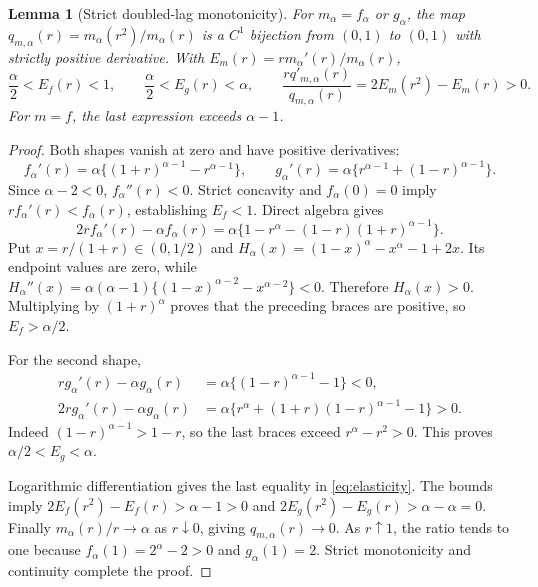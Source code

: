 \documentclass[11pt,a4paper]{article}
\newtheorem{lemma}[theorem]{Lemma}
\theoremstyle{remark}\newtheorem{remark}[theorem]{Remark}
\begin{document}
\begin{lemma}[Strict doubled-lag monotonicity]\label{lem:ratio}
For $m_\alpha=f_\alpha$ or $g_\alpha$, the map
$q_{m,\alpha}(r)=m_\alpha(r^2)/m_\alpha(r)$ is a $C^1$ bijection from $(0,1)$ to $(0,1)$ with strictly positive derivative. With $E_m(r)=rm_\alpha'(r)/m_\alpha(r)$,
\begin{equation}\label{eq:elasticity}
\frac\alpha2<E_f(r)<1,\qquad
\frac\alpha2<E_g(r)<\alpha,\qquad
\frac{rq'_{m,\alpha}(r)}{q_{m,\alpha}(r)}=2E_m(r^2)-E_m(r)>0.
\end{equation}
For $m=f$, the last expression exceeds $\alpha-1$.
\end{lemma}
\begin{proof}
Both shapes vanish at zero and have positive derivatives:
\[
f_\alpha'(r)=\alpha\{(1+r)^{\alpha-1}-r^{\alpha-1}\},\qquad
g_\alpha'(r)=\alpha\{r^{\alpha-1}+(1-r)^{\alpha-1}\}.
\]
Since $\alpha-2<0$, $f_\alpha''(r)<0$. Strict concavity and $f_\alpha(0)=0$ imply $rf_\alpha'(r)<f_\alpha(r)$, establishing $E_f<1$. Direct algebra gives
\[
2rf_\alpha'(r)-\alpha f_\alpha(r)
=\alpha\{1-r^\alpha-(1-r)(1+r)^{\alpha-1}\}.
\]
Put $x=r/(1+r)\in(0,1/2)$ and
$H_\alpha(x)=(1-x)^\alpha-x^\alpha-1+2x$.
Its endpoint values are zero, while
$H_\alpha''(x)=\alpha(\alpha-1)\{(1-x)^{\alpha-2}-x^{\alpha-2}\}<0$.
Therefore $H_\alpha(x)>0$. Multiplying by $(1+r)^\alpha$ proves that the preceding braces are positive, so $E_f>\alpha/2$.

For the second shape,
\begin{align*}
rg_\alpha'(r)-\alpha g_\alpha(r)&=\alpha\{(1-r)^{\alpha-1}-1\}<0,\\
2rg_\alpha'(r)-\alpha g_\alpha(r)&=\alpha\{r^\alpha+(1+r)(1-r)^{\alpha-1}-1\}>0.
\end{align*}
Indeed $(1-r)^{\alpha-1}>1-r$, so the last braces exceed $r^\alpha-r^2>0$. This proves $\alpha/2<E_g<\alpha$.

Logarithmic differentiation gives the last equality in \eqref{eq:elasticity}. The bounds imply $2E_f(r^2)-E_f(r)>\alpha-1>0$ and $2E_g(r^2)-E_g(r)>\alpha-\alpha=0$.
Finally $m_\alpha(r)/r\to\alpha$ as $r\downarrow0$, giving $q_{m,\alpha}(r)\to0$. As $r\uparrow1$, the ratio tends to one because $f_\alpha(1)=2^\alpha-2>0$ and $g_\alpha(1)=2$. Strict monotonicity and continuity complete the proof.
\end{proof}
\end{document}
